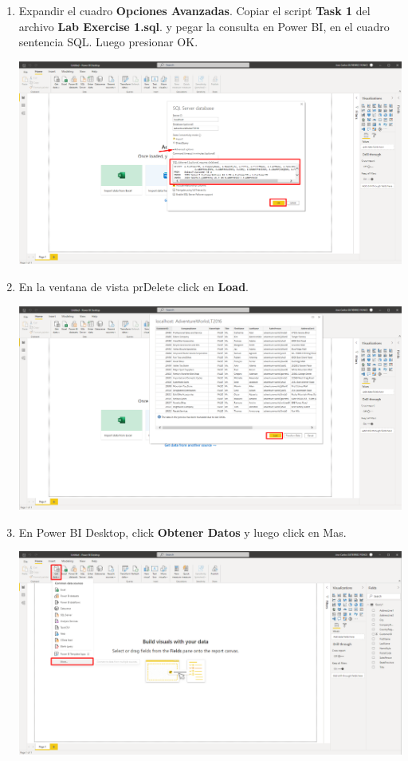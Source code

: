 \documentclass[12pt,letterpaper]{article}
\newcommand\tab[1][1cm]{\hspace*{#1}}
\begin{document}
\begin{enumerate}[\tab 1.]
\begin{center}
        \end{center}
        \item Expandir el cuadro \textbf{Opciones Avanzadas}. Copiar el script \textbf{Task 1} del archivo \textbf{Lab Exercise 1.sql}. y pegar la consulta en Power BI, en el cuadro sentencia SQL. Luego presionar OK.
        \begin{center}
            \includegraphics[width=13cm]{./img/img9.png}
        \end{center}
        \item En la ventana de vista prDelete click en \textbf{Load}.
        \begin{center}
            \includegraphics[width=13cm]{./img/img10.png}
        \end{center}
        \item En Power BI Desktop, click \textbf{Obtener Datos} y luego click en Mas.
        \begin{center}
            \includegraphics[width=13cm]{./img/img11.png}

\end{center}
\end{enumerate}
\end{document}
